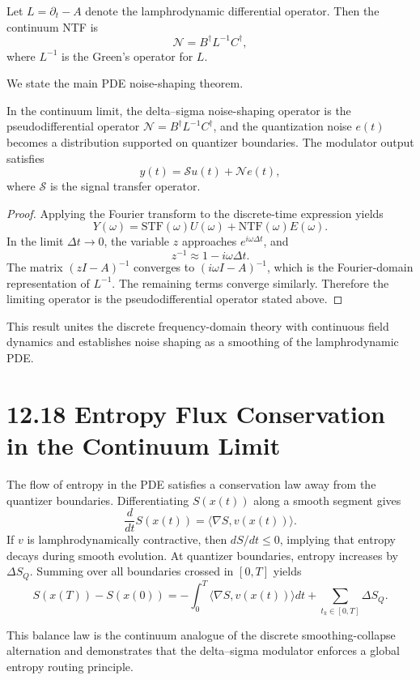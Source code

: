 Let $L = \partial_{t} - A$ denote the lamphrodynamic differential operator. Then the continuum NTF is
\[
\mathcal{N} = B^{\dagger} L^{-1} C^{\dagger},
\]
where $L^{-1}$ is the Green’s operator for $L$.

We state the main PDE noise-shaping theorem.

\begin{theorem}
In the continuum limit, the delta--sigma noise-shaping operator is the pseudodifferential operator $\mathcal{N} = B^{\dagger} L^{-1} C^{\dagger}$, and the quantization noise $e(t)$ becomes a distribution supported on quantizer boundaries. The modulator output satisfies
\[
y(t) = \mathcal{S} u(t) + \mathcal{N} e(t),
\]
where $\mathcal{S}$ is the signal transfer operator.
\end{theorem}

\begin{proof}
Applying the Fourier transform to the discrete-time expression yields
\[
Y(\omega) = \mathrm{STF}(\omega)U(\omega) + \mathrm{NTF}(\omega)E(\omega).
\]
In the limit $\Delta t \to 0$, the variable $z$ approaches $e^{i\omega \Delta t}$, and
\[
z^{-1} \approx 1 - i\omega \Delta t.
\]
The matrix $(zI - A)^{-1}$ converges to $(i\omega I - A)^{-1}$, which is the Fourier-domain representation of $L^{-1}$. The remaining terms converge similarly. Therefore the limiting operator is the pseudodifferential operator stated above.
\end{proof}

This result unites the discrete frequency-domain theory with continuous field dynamics and establishes noise shaping as a smoothing of the lamphrodynamic PDE.

\section*{12.18 Entropy Flux Conservation in the Continuum Limit}

The flow of entropy in the PDE satisfies a conservation law away from the quantizer boundaries. Differentiating $S(x(t))$ along a smooth segment gives
\[
\frac{d}{dt} S(x(t)) = \langle \nabla S, v(x(t)) \rangle.
\]
If $v$ is lamphrodynamically contractive, then $dS/dt \leq 0$, implying that entropy decays during smooth evolution. At quantizer boundaries, entropy increases by $\Delta S_{Q}$. Summing over all boundaries crossed in $[0,T]$ yields
\[
S(x(T)) - S(x(0)) = -\int_{0}^{T} \langle \nabla S, v(x(t)) \rangle dt + \sum_{t_{k} \in [0,T]} \Delta S_{Q}.
\]

This balance law is the continuum analogue of the discrete smoothing-collapse alternation and demonstrates that the delta--sigma modulator enforces a global entropy routing principle.

